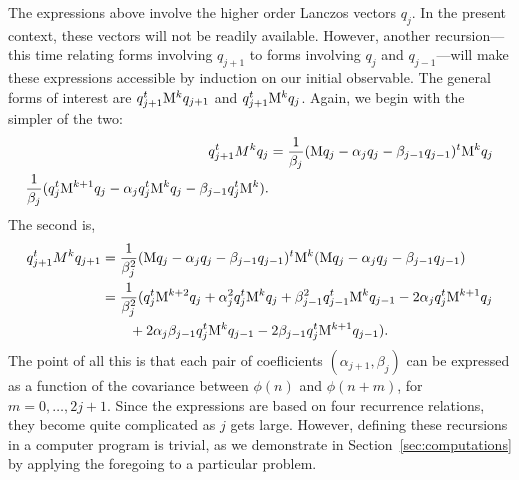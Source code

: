 The expressions above involve the higher order Lanczos vectors $q_j$. In the present context,
these vectors will not be readily available. However, another recursion---this time relating forms
involving $q_{j+1}$ to forms involving $q_j$ and $q_{j-1} $---will make these
expressions accessible by induction on our initial observable. The general forms
of interest are $q_{j+1}^t\mathrm{M}^k q_{j+1}$ and $q^t_{j+1}\mathrm{M}^k q_j$. Again, we 
begin with the simpler of the two:
\begin{align*}
  q_{j+1}^tM^kq_j &= 
 \frac{1}{\beta_j}(\mathrm{M} q_j - \alpha_j q_j - \beta_{j-1} q_{j-1})^t\mathrm{M}^k q_j\\
 \frac{1}{\beta_j}(q_j^t\mathrm{M}^{k+1} q_j - \alpha_j q_j^t\mathrm{M}^{k} q_j -\beta_{j-1} q_j^t\mathrm{M}^k).
\end{align*}
The second is,
\begin{align}
\label{eq:4.12}
  q_{j+1}^tM^kq_{j+1} 
&=  \frac{1}{\beta_j^2}(\mathrm{M} q_j - \alpha_j q_j - \beta_{j-1} q_{j-1})^t\mathrm{M}^k 
  (\mathrm{M} q_j - \alpha_j q_j - \beta_{j-1} q_{j-1})\nonumber\\
&=  \frac{1}{\beta_j^2}(q_j^t\mathrm{M}^{k+2} q_j + \alpha^2_jq_j^t\mathrm{M}^{k} q_j 
  + \beta^2_{j-1} q_{j-1}^t\mathrm{M}^k q_{j-1} - 2\alpha_jq_j^t\mathrm{M}^{k+1} q_j \nonumber\\
& \qquad    
    + 2\alpha_j \beta_{j-1}q_j^t\mathrm{M}^k q_{j-1}
    - 2\beta_{j-1}q_j^t \mathrm{M}^{k+1}q_{j-1}).
\end{align}
The point of all this is that each pair of coeﬂicients $(\alpha_{j+1}, \beta_j)$
can be expressed as a function of the covariance between 
$\phi(n)$ and $\phi(n+ m)$, for $m = 0, \dots, 2j+1$. Since the expressions
are based on four recurrence relations, they become quite complicated as $j$ gets large. However,
defining these recursions in a computer program is trivial, as we demonstrate
in Section~\ref{sec:computations} %
by applying the foregoing to a particular problem.
%
%
%
%

